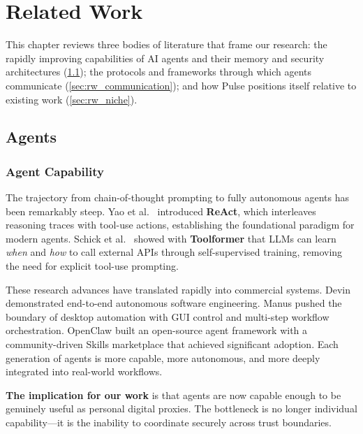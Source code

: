 \chapter{Related Work}
\label{chapter:related_work}

This chapter reviews three bodies of literature that frame our research: the rapidly improving capabilities of AI agents and their memory and security architectures (\cref{sec:rw_agents}); the protocols and frameworks through which agents communicate (\cref{sec:rw_communication}); and how Pulse positions itself relative to existing work (\cref{sec:rw_niche}).

\section{Agents}
\label{sec:rw_agents}

\subsection{Agent Capability}

The trajectory from chain-of-thought prompting to fully autonomous agents has been remarkably steep. Yao et al.\ \cite{yao2023react} introduced \textbf{ReAct}, which interleaves reasoning traces with tool-use actions, establishing the foundational paradigm for modern agents. Schick et al.\ \cite{schick2023toolformer} showed with \textbf{Toolformer} that LLMs can learn \textit{when} and \textit{how} to call external APIs through self-supervised training, removing the need for explicit tool-use prompting.

These research advances have translated rapidly into commercial systems. Devin \cite{devin2024} demonstrated end-to-end autonomous software engineering. Manus \cite{manus2025} pushed the boundary of desktop automation with GUI control and multi-step workflow orchestration. OpenClaw \cite{openclaw2025} built an open-source agent framework with a community-driven Skills marketplace that achieved significant adoption. Each generation of agents is more capable, more autonomous, and more deeply integrated into real-world workflows.

\textbf{The implication for our work} is that agents are now capable enough to be genuinely useful as personal digital proxies. The bottleneck is no longer individual capability---it is the inability to coordinate securely across trust boundaries.

